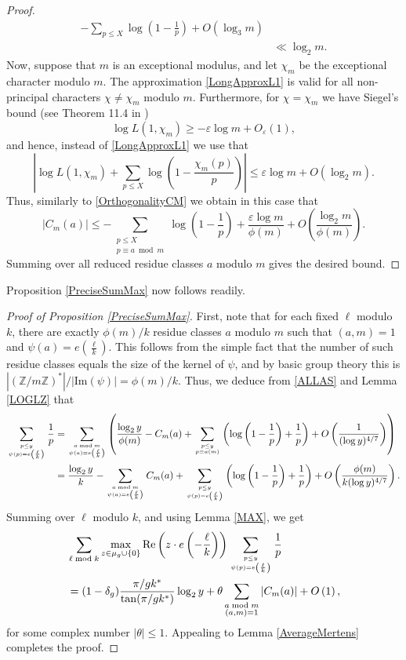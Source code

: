 \documentclass[12pt]{amsart}
\theoremstyle{definition}
\numberwithin{equation}{section}
\newcommand{\mb}{\mathbb}
\begin{document}
\begin{proof}
\begin{align*}
- \sum_{p\leq X}\log \left(1-\frac{1}{p}\right) +O(\log_3m)\\
& \ll \log_2 m.
\end{align*}
Now, suppose that $m$ is an exceptional modulus, and let $\chi_m$ be the exceptional character modulo $m$. The approximation \eqref{LongApproxL1} is valid for all non-principal characters $\chi\neq \chi_m$ modulo $m$. Furthermore, for $\chi=\chi_m$ we have Siegel's bound (see Theorem 11.4 in \cite{MVbook})
$$ \log L(1, \chi_m)\geq -\varepsilon \log m +O_{\varepsilon}(1),$$
and hence, instead of \eqref{LongApproxL1} we use that
$$ \left|\log L(1, \chi_m) + \sum_{p\leq X}\log\left(1-
\frac{\chi_m(p)}{p}\right)\right|\leq \varepsilon\log m+ O(\log_2 m).$$
Thus, similarly to \eqref{OrthogonalityCM} we obtain in this case that
$$
|C_m(a)| \leq -\sum_{\substack{p\leq X\\ p\equiv a \bmod m}}\log \left(1-\frac{1}{p}\right)+ \frac{\varepsilon\log m}{\phi(m)}+O\left(\frac{\log_2 m}{\phi(m)}\right).$$
Summing over all reduced residue classes $a$ modulo $m$ gives the desired bound.
\end{proof}
Proposition \ref{PreciseSumMax} now follows readily.
\begin{proof}[Proof of Proposition \ref{PreciseSumMax}]
First, note that for each fixed $\ell$ modulo $k$, there are exactly $\phi(m)/k$ residue classes $a$ modulo $m$ such that $(a,m)=1$ and $\psi(a) = e\left(\frac{\ell}{k}\right)$. This follows from the simple fact that the number of such residue classes equals the size of the kernel of $\psi$, and by basic group theory this is $|\left(\mb{Z}/m\mb{Z}\right)^{\ast}|/|\text{Im}(\psi)| = \phi(m)/k$. Thus, we deduce from \eqref{ALLAS} and Lemma \ref{LOGLZ} that
\begin{align*}
\sum_{p \leq y \atop \psi(p) = e\left(\frac{\ell}{k}\right)} \frac{1}{p} &= \sum_{a\bmod m \atop \psi(a) = e\left(\frac{\ell}{k}\right)} \left(\frac{\log_2 y}{\phi(m)} - C_m(a) + \sum_{p \leq y \atop p \equiv a(m)} \left(\log\left(1-\frac{1}{p}\right)+ \frac{1}{p}\right) + O\left(\frac{1}{(\log y)^{4/7}}\right)\right)\\
&= \frac{\log_2 y}{k} - \sum_{a \bmod m \atop \psi(a) = e\left(\frac{\ell}{k}\right)} C_m(a) + \sum_{p \leq y \atop \psi(p) =e\left(\frac{\ell}{k}\right)} \left(\log\left(1-\frac{1}{p}\right) + \frac{1}{p}\right) + O\left(\frac{\phi(m)}{k(\log y)^{4/7}}\right).
\end{align*}
Summing over $\ell$ modulo $k$, and using Lemma \ref{MAX},  we get
\begin{align*}
&\sum_{\ell\bmod k} \max_{z \in \mu_g \cup \{0\}} \textup{Re}\left(z \cdot e\left(-\frac{\ell}{k}\right)\right)\sum_{p \leq y \atop \psi(p)= e\left(\frac{\ell}{k}\right)} \frac{1}{p} \\
&= (1-\delta_g)\frac{\pi/gk^{\ast}}{\tan(\pi/gk^{\ast})}\log_2 y + \theta \sum_{\substack{a \bmod m\\ (a,m)=1}} |C_m(a)|+ O\left(1\right),
\end{align*}
for some complex number $|\theta|\leq 1$. Appealing to Lemma \ref{AverageMertens} completes the proof. 
\end{proof}
\end{document}
